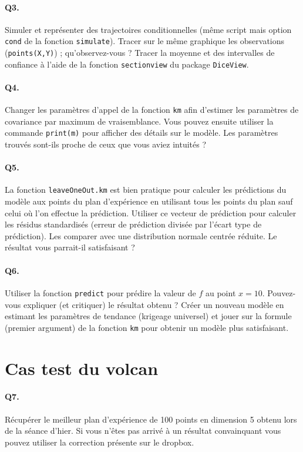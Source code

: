 \documentclass[12pt]{scrartcl}
\begin{document}
\paragraph{Q3.} Simuler et représenter des trajectoires conditionnelles (même script mais option \texttt{cond} de la fonction \texttt{simulate}). Tracer sur le même graphique les observations (\texttt{points(X,Y)}) ; qu'observez-vous ?
Tracer la moyenne et des intervalles de confiance à l'aide de la fonction \texttt{sectionview} du package \texttt{DiceView}.

\paragraph{Q4.} Changer les paramètres d'appel de la fonction \texttt{km} afin d'estimer les paramètres de covariance par maximum de vraisemblance. 
Vous pouvez ensuite utiliser la commande \texttt{print(m)} pour afficher des détails sur le modèle. Les paramètres trouvés sont-ils proche de ceux que vous aviez intuités ?

\paragraph{Q5.} La fonction \texttt{leaveOneOut.km} est bien pratique pour calculer les prédictions du modèle aux points du plan d'expérience en utilisant tous les points du plan sauf celui où l'on effectue la prédiction. Utiliser ce vecteur de prédiction pour calculer les résidus standardisés (erreur de prédiction divisée par l'écart type de prédiction). Les comparer avec une distribution normale centrée réduite. Le résultat vous parrait-il satisfaisant ?  

\paragraph{Q6.} Utiliser la fonction \texttt{predict} pour prédire la valeur de $f$ au point $x=10$. Pouvez-vous expliquer (et critiquer) le résultat obtenu ? Créer un nouveau modèle en estimant les paramètres de tendance (krigeage universel) et jouer sur la formule (premier argument) de la fonction \texttt{km} pour obtenir un modèle plus satisfaisant.

\section{Cas test du volcan}

\paragraph{Q7.} Récupérer le meilleur plan d'expérience de 100 points en dimension 5 obtenu lors de la séance d'hier. Si vous n'êtes pas arrivé à un résultat convainquant vous pouvez utiliser la correction présente sur le dropbox.
\end{document}
